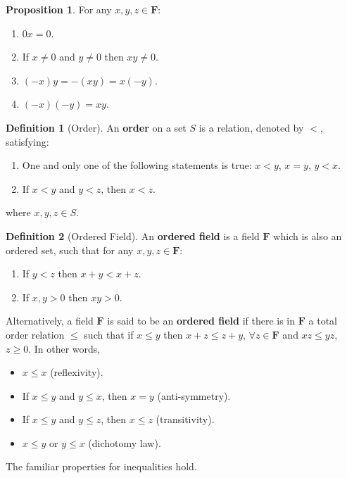 \documentclass[12pt,a4paper]{article}
\theoremstyle{definition}
\newtheorem{proposition}[theorem]{Proposition}
\newtheorem{definition}{Definition}[section]
\begin{document}
\begin{proposition}
  For any $x,y,z \in \textbf{F}$:
  \begin{enumerate}
    \item $0x = 0$.
    \item If $x \neq 0$ and $y \neq 0$ then $xy \neq 0$.
    \item $(-x)y = -(xy) = x(-y)$.
    \item $(-x)(-y) = xy$.
  \end{enumerate}
\end{proposition}

\begin{definition}[Order]
An \textbf{order} on a set \(S\) is a relation, denoted by \(<\),
satisfying:
\begin{enumerate}
  \item One and only one of the following statements is true: \(x < y\),
  \(x = y\), \(y < x\).
  \item If \(x < y\) and \(y < z\), then \(x < z\).
\end{enumerate}
where \(x,y,z \in S\).
\end{definition}

\begin{definition}[Ordered Field]
  An \textbf{ordered field} is a field $\textbf{F}$ which is also an ordered set, such that for any $x, y, z \in \textbf{F}$:
  \begin{enumerate}
    \item If $y < z$ then $x+y < x+z$.
    \item If $x, y > 0$ then $xy > 0$.
  \end{enumerate}
  
  Alternatively, a field $\textbf{F}$ is said to be an \textbf{ordered field} if there is in $\textbf{F}$ a total order relation $\leq$ such that if $x \leq y$ then $x + z \leq z + y$, $\forall z \in \textbf{F}$ and $xz \leq yz$, $z \geq 0$. In other words,
  \begin{itemize}
  	\item $x \leq x$ (reflexivity).
  	\item If $x \leq y$ and $y \leq x$, then $ x = y$ (anti-symmetry).
  	\item If $x \leq y$ and $y \leq z$, then $ x \leq z$ (transitivity).
  	\item $x \leq y$ or $y \leq x$ (dichotomy law).
  \end{itemize}
\end{definition}

The familiar properties for inequalities hold. 
\end{document}
